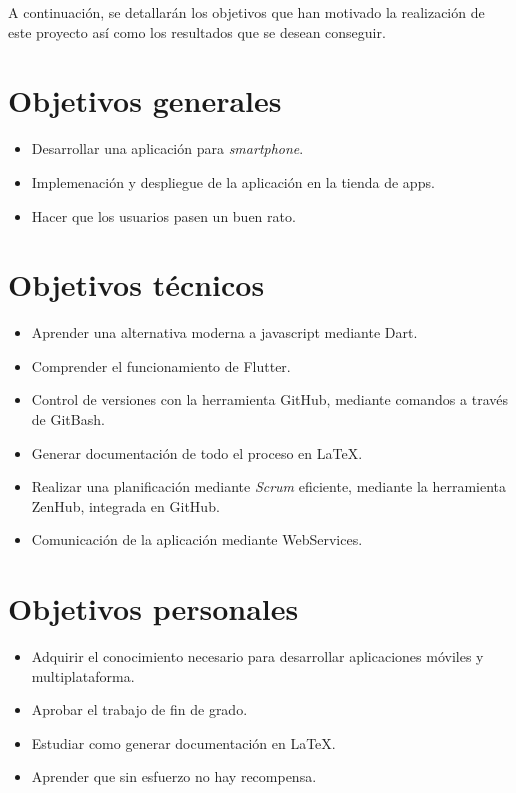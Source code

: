 

A continuación, se detallarán los objetivos que han motivado la realización de este proyecto así como los resultados que se desean conseguir.

\section{Objetivos generales}
\begin{itemize}
	\item Desarrollar una aplicación para \emph{smartphone}.
	\item Implemenación y despliegue de la aplicación en la tienda de apps.
	\item Hacer que los usuarios pasen un buen rato.
\end{itemize}

\section{Objetivos técnicos}
\begin{itemize}
	\item Aprender una alternativa moderna a javascript mediante Dart.
	\item Comprender el funcionamiento de Flutter.
	\item Control de versiones con la herramienta GitHub, mediante comandos a través de GitBash.
	\item Generar documentación de todo el proceso en \LaTeX.
	\item Realizar una planificación mediante \emph{Scrum} eficiente, mediante la herramienta ZenHub, integrada en GitHub.
	\item Comunicación de la aplicación mediante WebServices.
	
\end{itemize}

\section{Objetivos personales}
\begin{itemize}
	\item Adquirir el conocimiento necesario para desarrollar aplicaciones móviles y multiplataforma.
	\item Aprobar el trabajo de fin de grado.
	\item Estudiar como generar documentación en \LaTeX.
	\item Aprender que sin esfuerzo no hay recompensa.
\end{itemize}